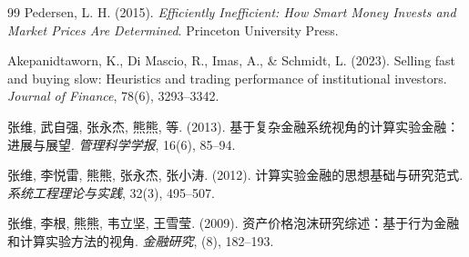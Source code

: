 \begin{thebibliography}{99}
Pedersen, L. H. (2015). \textit{Efficiently Inefficient: How Smart Money Invests and Market Prices Are Determined}. Princeton University Press.

Akepanidtaworn, K., Di Mascio, R., Imas, A., \& Schmidt, L. (2023). Selling fast and buying slow: Heuristics and trading performance of institutional investors. \textit{Journal of Finance}, 78(6), 3293--3342.


张维, 武自强, 张永杰, 熊熊, 等. (2013). 基于复杂金融系统视角的计算实验金融：进展与展望. \textit{管理科学学报}, 16(6), 85--94.

张维, 李悦雷, 熊熊, 张永杰, 张小涛. (2012). 计算实验金融的思想基础与研究范式. \textit{系统工程理论与实践}, 32(3), 495--507.

张维, 李根, 熊熊, 韦立坚, 王雪莹. (2009). 资产价格泡沫研究综述：基于行为金融和计算实验方法的视角. \textit{金融研究}, (8), 182--193.

\end{thebibliography}
